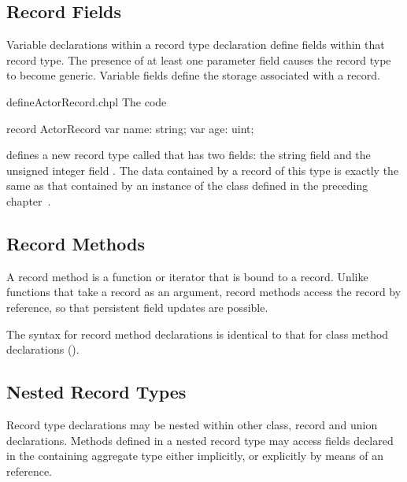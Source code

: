 \subsection{Record Fields}
\label{Record_Fields}

Variable declarations within a record type declaration define fields within that
record type.  The presence of at least one parameter field causes the record
type to become generic.  Variable fields define the storage associated with a
record.

\begin{chapelexample}{defineActorRecord.chpl}
The code
\begin{chapel}
record ActorRecord {
  var name: string;
  var age: uint;
}
\end{chapel}
\begin{chapeloutput}
\end{chapeloutput}
defines a new record type called  that has two fields: the
string field  and the unsigned integer field .  The data
contained by a record of this type is exactly the same as that contained by
an instance of the  class defined in the preceding chapter~.
\end{chapelexample}

\subsection{Record Methods}
\label{Record_Methods}

A record method is a function or iterator that is bound to a record.  Unlike
functions that take a record as an argument, record methods access the record by
reference, so that persistent field updates are possible.

The syntax for record method declarations is identical to that for class method
declarations ().

\subsection{Nested Record Types}
\label{Nested_Record_Types}

Record type declarations may be nested within other class, record and union
declarations.  Methods defined in a nested record type may access fields
declared in the containing aggregate type either implicitly, or explicitly by
means of an  reference.

